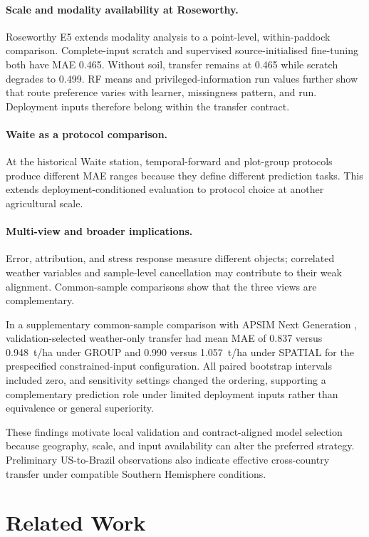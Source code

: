 \documentclass[runningheads]{venue/lncs/llncs}
\begin{document}
\paragraph{Scale and modality availability at Roseworthy.}
Roseworthy E5 extends modality analysis to a point-level, within-paddock comparison. Complete-input scratch and supervised source-initialised fine-tuning both have MAE 0.465. Without soil, transfer remains at 0.465 while scratch degrades to 0.499. RF means and privileged-information run values further show that route preference varies with learner, missingness pattern, and run. Deployment inputs therefore belong within the transfer contract.

\paragraph{Waite as a protocol comparison.}
At the historical Waite station, temporal-forward and plot-group protocols produce different MAE ranges because they define different prediction tasks. This extends deployment-conditioned evaluation to protocol choice at another agricultural scale.

\paragraph{Multi-view and broader implications.}
Error, attribution, and stress response measure different objects; correlated weather variables and sample-level cancellation may contribute to their weak alignment. Common-sample comparisons show that the three views are complementary.

In a supplementary common-sample comparison with APSIM Next Generation \cite{Holzworth2018APSIMNextGen}, validation-selected weather-only transfer had mean MAE of 0.837 versus 0.948~t/ha under GROUP and 0.990 versus 1.057~t/ha under SPATIAL for the prespecified constrained-input configuration. All paired bootstrap intervals included zero, and sensitivity settings changed the ordering, supporting a complementary prediction role under limited deployment inputs rather than equivalence or general superiority.

These findings motivate local validation and contract-aligned model selection because geography, scale, and input availability can alter the preferred strategy. Preliminary US-to-Brazil observations also indicate effective cross-country transfer under compatible Southern Hemisphere conditions.

\section{Related Work}
\end{document}
